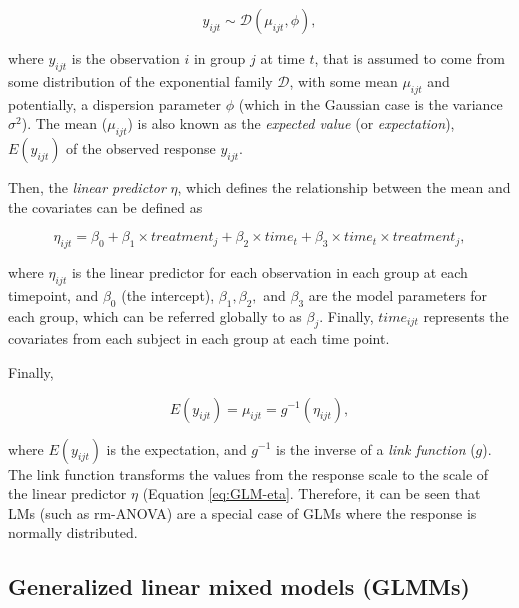 \documentclass[
]{article}
\begin{document}
\begin{equation}
y_{ijt} \sim \mathcal{D}(\mu_{ijt},\phi),
\label{eq:GLM-y}
\end{equation}

where \(y_{ijt}\) is the observation \(i\) in group \(j\) at time \(t\), that is assumed to come from some distribution of the exponential family \(\mathcal{D}\), with some mean \(\mu_{ijt}\) and potentially, a dispersion parameter \(\phi\) (which in the Gaussian case is the variance \(\sigma^{2}\)). The mean (\(\mu_{ijt}\)) is also known as the \emph{expected value} (or \emph{expectation}), \(E(y_{ijt})\) of the observed response \(y_{ijt}\).

Then, the \emph{linear predictor} \(\eta\), which defines the relationship between the mean and the covariates can be defined as

\begin{equation}
\eta_{ijt}=\beta_0+\beta_1 \times treatment_{j} +\beta_2 \times time_{t} +\beta_3 \times time_{t}\times treatment_{j},
\label{eq:GLM-eta}
\end{equation}

where \(\eta_{ijt}\) is the linear predictor for each observation in each group at each timepoint, and \(\beta_0\) (the intercept), \(\beta_{1}, \beta_2,\) and \(\beta_3\) are the model parameters for each group, which can be referred globally to as \(\beta_j\). Finally, \(time_{ijt}\) represents the covariates from each subject in each group at each time point.

Finally,

\begin{equation}
E(y_{ijt})=\mu_{ijt}=g^{-1}(\eta_{ijt}),
\label{eq:GLM-Expectation}
\end{equation}

where \(E(y_{ijt})\) is the expectation, and \(g^{-1}\) is the inverse of a \emph{link function} (\(g\)). The link function transforms the values from the response scale to the scale of the linear predictor \(\eta\) (Equation \eqref{eq:GLM-eta}. Therefore, it can be seen that LMs (such as rm-ANOVA) are a special case of GLMs where the response is normally distributed.

\hypertarget{generalized-linear-mixed-models-glmms}{%
\subsection{Generalized linear mixed models (GLMMs)}\label{generalized-linear-mixed-models-glmms}}
\end{document}
